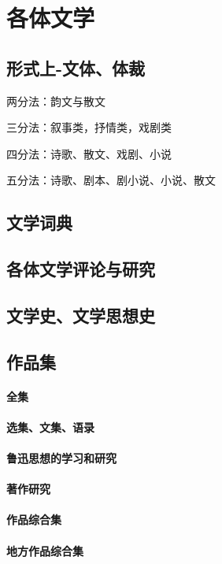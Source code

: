 \documentclass[UTF8]{../../RepresentationUniverse}
\begin{document}
\chapter{各体文学}

\section{形式上-文体、体裁}

两分法：韵文与散文

三分法：叙事类，抒情类，戏剧类

四分法：诗歌、散文、戏剧、小说

五分法：诗歌、剧本、剧小说、小说、散文

\section{文学词典}
\section{各体文学评论与研究}
\section{文学史、文学思想史}

\section{作品集}

\subsubsection{全集}
\subsubsection{选集、文集、语录}
\subsubsection{鲁迅思想的学习和研究}
\subsubsection{著作研究}

\subsubsection{作品综合集}
\subsubsection{地方作品综合集}
\end{document}
